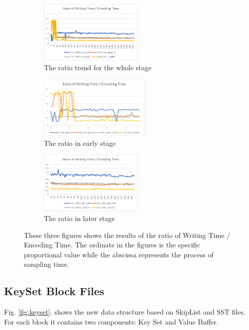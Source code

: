 \begin{figure}
	\label{fig:we_values}
	\begin{subfigure}[t]{0.3\linewidth}
		\centering
		\includegraphics[height= 3cm]{fig/ratio_full}
		\caption{The ratio trend for the whole stage}
		\label{fig:ratiofull}
	\end{subfigure}%
	\hspace{0.5cm}
	\begin{subfigure}[t]{0.3\linewidth}
		\centering
		\includegraphics[height= 3cm]{fig/ratio_first_50}
		\caption{The ratio in early stage}
		\label{fig:ratiofirst50}
	\end{subfigure}%
	\hspace{0.5cm}
	\begin{subfigure}[t]{0.3\linewidth}
		\centering
		\includegraphics[height= 3cm]{fig/ratio_last_170}
		\caption{The ratio in later stage}
		\label{fig:ratiolast170}
	\end{subfigure}
	\caption{These three figures shows the results of the ratio of Writing Time / Encoding Time. The ordinate in the figures is the specific proportional value while the abscissa represents the process of sampling time.}
\end{figure}

\subsection{KeySet Block Files}\label{sec:format_introduction}
Fig. \ref{fig:keyset}. shows the new data structure based on SkipList and SST files. For each block it contains two components: Key Set and Value Buffer. 

